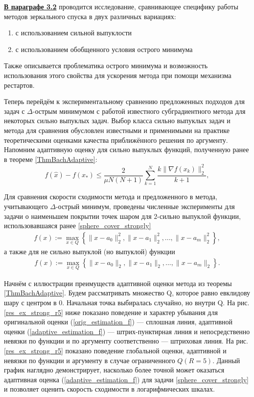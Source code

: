 \underline{\textbf{В параграфе 3.2}} проводится исследование, сравнивающее специфику работы методов зеркального спуска в двух различных вариациях: 
\begin{enumerate}
    \item с использованием сильной выпуклости
    \item с использованием обобщенного условия острого минимума
\end{enumerate}
Также описывается проблематика острого минимума и возможность использования этого свойства для ускорения метода при помощи механизма рестартов.

Теперь перейдём к экспериментальному сравнению предложенных подходов для задач с $\Delta$-острым минимумом с работой известного субградиентного метода \cite{Bach_2012} для некоторых сильно выпуклых задач. Выбор класса сильно выпуклых задач и метода \cite{Bach_2012} для сравнения обусловлен известными и  применимыми на практике теоретическими оценками качества приближённого решения по аргументу. Напомним адаптивную оценку для сильно выпуклых функций, полученную ранее в теореме \ref{ThmBachAdaptive}:
\begin{equation}
    f(\widehat{x}) - f(x_*) \leq \frac{2}{\mu N (N+1)} \sum_{k=1}^{N} \frac{k \|\nabla f(x_k)\|_2^2}{k+1},
\end{equation} 

Для сравнения скорости сходимости метода \cite{Bach_2012} и предложенного в \cite{sharp22} метода, учитывающего $\Delta$-острый минимум, проведены численные эксперименты для задачи о наименьшем покрытии точек шаром для $2$-сильно выпуклой функции, использовавшаяся ранее \eqref{sphere_cover_strongly}
\begin{gather}
    f(x) := \max_{x\in Q}\left\{\|x - a_0\|_2^2, \|x - a_1\|_2^2, ..., \|x - a_m\|_2^2\right\},
\end{gather}
а также для не сильно выпуклой (но выпуклой) функции
\begin{gather}\label{sphere_cover}
    f(x) := \max_{x\in Q}\left\{\|x - a_0\|_2, \|x - a_1\|_2, ..., \|x - a_m\|_2\right\}.
\end{gather}

Начнём с иллюстрации преимуществ адаптивной оценки метода \cite{Bach_2012} из теоремы \ref{ThmBachAdaptive}. Будем рассматривать множество Q, которое равно евклидову шару с центром в 0. Начальная точка выбиралась случайно, но внутри Q. На рис. \ref{res_ex_strong_r5} ниже показано поведение и характер убывания для оригинальной оценки (\ref{orig_estimation_f}) --- сплошная линия, адаптивной оценки (\ref{adaptive_estimation_f}) --- штрих-пунктирная линия и непосредственно невязки по функции и по аргументу соответственно --- штриховая линия. На рис. \ref{res_ex_strong_r5} показано поведение глобальной оценки, адаптивной и невязки по функции и аргументу в случае ограниченного $Q (R = 5)$. Данный график наглядно демонстрирует, насколько более точной может оказаться адаптивная оценка (\ref{adaptive_estimation_f}) для задачи \eqref{sphere_cover_strongly} и позволяет оценить скорость сходимости в логарифмических шкалах.

